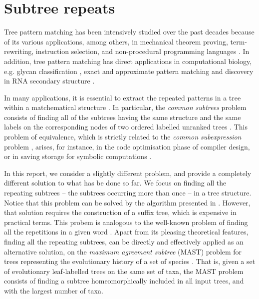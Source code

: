 \documentclass[preprint,12pt]{elsarticle}
\begin{document}


\section{Subtree repeats}
\label{sec SR}
%
Tree pattern matching has been intensively studied over the past decades
because of its various applications, among others, in mechanical theorem proving, 
term-rewriting, instruction selection, and non-procedural programming
languages \cite{Hoffmann,Dubiner94,Kosaraju89}. 
In addition, tree pattern matching has direct applications in computational biology, e.g.
glycan classification \cite{Kuboyama07}, exact and approximate pattern matching and discovery
in RNA secondary structure \cite{Mauri05}. 

In many applications, it is essential to extract the repeated patterns in a tree 
within a matchematical structure \cite{Downey80,Flajolet90,Karp72}. In particular, the \emph{common subtrees} 
problem consists of finding all of the subtrees having the same structure and the same labels
on the corresponding nodes of two ordered labelled unranked trees \cite{Grossi93}.
This problem of equivalence, which is strictly related to the \emph{common subexpression} problem \cite{Downey80,Flajolet90},
arises, for instance, in the code optimisation phase of compiler design, or in saving storage for symbolic computations \cite{Aho06,Downey80,Flajolet90}.

In this report, we consider a slightly different problem, and provide a completely different solution to what has be done so far. 
We focus on finding all the repeating subtrees -- the subtrees occurring more than once -- in a tree structure. Notice that this problem can be solved by the algorithm presented in \cite{Grossi93}. However, that solution requires the construction of a suffix tree, which is expensive in practical terms. This probem is analogous to the well-known problem of finding all the repetitions in a given word \cite{C81}. Apart from its pleasing theoretical features, 
finding all the repeating subtrees, can be directly and effectively applied as an alternative solution, on the
\emph{maximum agreement subtree} (MAST) problem for trees representing the evolutionary history of a set of species \cite{Guillemot}.
That is, given a set of evolutionary leaf-labelled trees on the same set of taxa, the MAST problem consists of finding a subtree homeomorphically
included in all input trees, and with the largest number of taxa.
\end{document}
